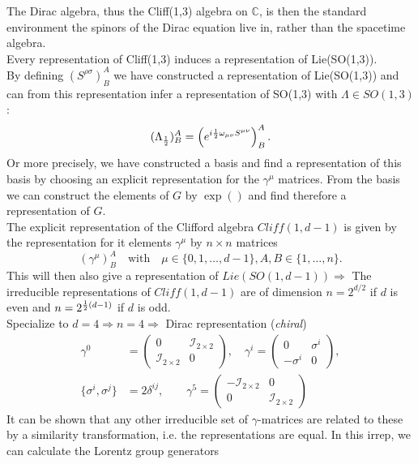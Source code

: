 The Dirac algebra, thus the Cliff(1,3) algebra on $\mathbb{C}$, is then the standard environment the spinors of the Dirac equation live in, rather than the spacetime algebra.\\
Every representation of Cliff(1,3) induces a representation of Lie(SO(1,3)).\\
By defining $(S^{\rho \sigma})^A_B$ we have constructed a representation of Lie(SO(1,3)) and can from this representation infer a representation of SO(1,3) with $\Lambda \in SO(1,3)$:
\begin{equation}
(\Lambda_{\frac{1}{2}})^A_B = \left(e^{i \frac{1}{2} \omega_{\mu \nu} S^{\mu \nu}} \right)^A_B.
\end{equation}
Or more precisely, we have constructed a basis and find a representation of this basis by choosing an explicit representation for the $\gamma^{\mu}$ matrices. From the basis we can construct the elements of $G$ by $\exp()$ and find therefore a representation of $G$.\\
The explicit representation of the Clifford algebra $Cliff(1,d-1)$ is given by the representation for it elements $\gamma^{\mu}$ by $n\times n$ matrices 
\begin{equation}
(\gamma^{\mu})^A_B \quad \mathrm{with} \quad \mu\in \{0,1, \dots, d-1\}, A,B\in\{1,\dots, n \}.
\end{equation}
This will then also give a representation of $Lie(SO(1,d-1)) \Rightarrow$ The irreducible representations of $Cliff(1,d-1)$ are of dimension    $n=2^{d/2}$ if $d$ is even and $n=2^{\frac{1}{2} (d-1)}$ if $d$ is odd.\\
Specialize to $d=4 \Rightarrow n=4 \Rightarrow$ Dirac representation (\emph{chiral})
\begin{align}
	\gamma^0 &= \begin{pmatrix}
		0 & \mathcal{I}_{2\times 2} \\
		\mathcal{I}_{2 \times 2} & 0 
	\end{pmatrix},
	\quad 
	\gamma^i=
	\begin{pmatrix}
		0 & \sigma^i \\-\sigma^i &0
	\end{pmatrix},
	\\
	\{\sigma^i, \sigma^j\} &=2 \delta^{ij}, \qquad \gamma^5=
	\begin{pmatrix}
		-\mathcal{I}_{2\times 2} &0 \\
		0& \mathcal{I}_{2 \times 2}
	\end{pmatrix}
\end{align}
It can be shown that any other irreducible set of $\gamma$-matrices are related to these by a similarity transformation, i.e. the representations are equal. In this irrep, we can calculate the Lorentz group generators
